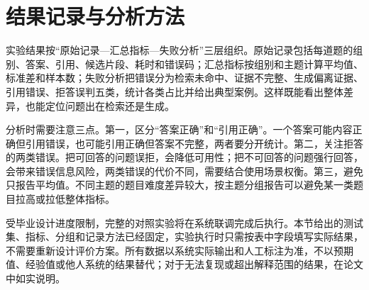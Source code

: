 \section{结果记录与分析方法}
\label{sec:analysis}

实验结果按“原始记录—汇总指标—失败分析”三层组织。原始记录包括每道题的组别、答案、引用、候选片段、耗时和错误码；汇总指标按组别和主题计算平均值、标准差和样本数；失败分析把错误分为检索未命中、证据不完整、生成偏离证据、引用错误、拒答误判五类，统计各类占比并给出典型案例。这样既能看出整体差异，也能定位问题出在检索还是生成。

分析时需要注意三点。第一，区分“答案正确”和“引用正确”。一个答案可能内容正确但引用错误，也可能引用正确但答案不完整，两者要分开统计。第二，关注拒答的两类错误。把可回答的问题误拒，会降低可用性；把不可回答的问题强行回答，会带来错误信息风险，两类错误的代价不同，需要结合使用场景权衡。第三，避免只报告平均值。不同主题的题目难度差异较大，按主题分组报告可以避免某一类题目拉高或拉低整体指标。

受毕业设计进度限制，完整的对照实验将在系统联调完成后执行。本节给出的测试集、指标、分组和记录方法已经固定，实验执行时只需按表中字段填写实际结果，不需要重新设计评价方案。所有数据以系统实际输出和人工标注为准，不以预期值、经验值或他人系统的结果替代；对于无法复现或超出解释范围的结果，在论文中如实说明。
